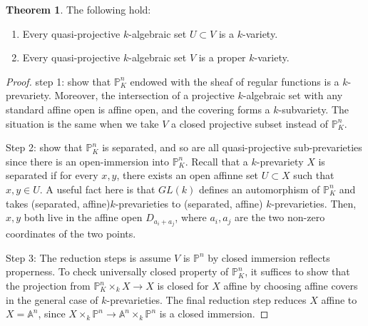 \documentclass{article}
\theoremstyle{definition}
\newtheorem{theorem}{Theorem}[section]
\theoremstyle{definition}
\theoremstyle{definition}
\theoremstyle{definition}
\theoremstyle{definition}
\theoremstyle{definition}
\theoremstyle{definition}
\begin{document}
\begin{tcolorbox}[colback=red!5!white,colframe=red!30!white]
\begin{theorem}
The following hold: 
\begin{enumerate}
    \item Every quasi-projective $k$-algebraic set $U\subset V$ is a $k$-variety. 
    \item Every quasi-projective $k$-algebraic set $V$ is a proper $k$-variety. 
\end{enumerate}
\end{theorem}
\end{tcolorbox}
\begin{proof}
    step 1: show that $\mathbb{P}^n_K$ endowed with the sheaf of regular functions is a $k$-prevariety. Moreover, the intersection of a projective $k$-algebraic set with any standard affine open is affine open, and the covering forms a $k$-subvariety. The situation is the same when we take $V$ a closed projective subset instead of $\mathbb{P}^n_K$. 

    Step 2: show that $\mathbb{P}^n_K$ is separated, and so are all quasi-projective sub-prevarieties since there is an open-immersion into $\mathbb{P}^n_K$. Recall that a $k$-prevariety $X$ is separated if for every $x,y$, there exists an open affinne set $U\subset X$ such that $x,y\in U$. A useful fact here is that $GL(k)$ defines an automorphism of $\mathbb{P}^n_K$ and takes (separated, affine)$k$-prevarieties to (separated, affine) $k$-prevarieties. Then, $x,y$ both live in the affine open $D_{a_i+a_j}$, where $a_i,a_j$ are the two non-zero coordinates of the two points. 

    Step 3: The reduction steps is assume $V$ is $\mathbb{P}^n$ by closed immersion reflects properness. To check universally closed property of $\mathbb{P}^n_K$, it suffices to show that the projection from $\mathbb{P}^n_K\times_k X\to X$ is closed for $X$ affine by choosing affine covers in the general case of $k$-prevarieties. The final reduction step reduces $X$ affine to $X=\mathbb{A}^n$, since $X\times_k \mathbb{P}^n\to \mathbb{A}^n\times_k \mathbb{P}^n$ is a closed immersion.


\end{proof}
\end{document}
